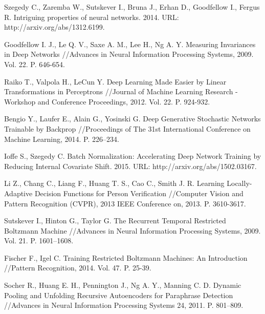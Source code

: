\documentclass[12pt,notitlepage]{article}
\begin{document}
\begin{thebibliography}{10}
{Szegedy C., 
Zaremba W.,
Sutskever I., 
Bruna J., 
Erhan D., 
Goodfellow I.,
Fergus R.}
Intriguing properties of neural networks. 2014. URL: http://arxiv.org/abs/1312.6199.

{Goodfellow I. J., Le Q. V., Saxe A. M., Lee H., Ng A. Y.}
Measuring Invariances in Deep Networks //{Advances in Neural Information Processing Systems}, 2009. Vol. 22. P. 646-654.


{Raiko T.,  Valpola H., LeCun Y.}
Deep Learning Made Easier by Linear Transformations in
Perceptrons //{Journal of Machine Learning Research - Workshop and Conference Proceedings}, 2012. Vol. 22. P. 924-932.

{Bengio Y.,  Laufer E., Alain G.,  Yosinski G. }
Deep Generative Stochastic Networks Trainable by Backprop //{Proceedings of The 31st International Conference on Machine Learning}, 2014. P. 226–234.


{Ioffe S., Szegedy C.}
Batch Normalization: Accelerating Deep Network Training by Reducing Internal Covariate Shift. 2015. URL: http://arxiv.org/abs/1502.03167.

{Li Z.,  Chang C., Liang F., Huang T. S.,  Cao C.,  Smith J. R.}
Learning Locally-Adaptive Decision Functions for Person Verification //{Computer Vision and Pattern Recognition (CVPR), 2013 IEEE Conference on}, 2013. P. 3610-3617.

{Sutskever I.,  Hinton G.,  Taylor G.}
The Recurrent Temporal Restricted Boltzmann
Machine //{Advances in Neural Information Processing Systems}, 2009. Vol. 21. P. 1601--1608.

 {Fischer F., Igel C.}
Training Restricted Boltzmann Machines: An Introduction //{Pattern Recognition}, 2014. Vol. 47. P. 25-39.

{Socher R.,  Huang E. H.,  Pennington J.,  Ng A. Y., Manning C. D. }
Dynamic Pooling and Unfolding Recursive Autoencoders for Paraphrase Detection //{Advances in Neural Information Processing Systems 24}, 2011. P. 801--809.




\end{thebibliography}
\end{document}
